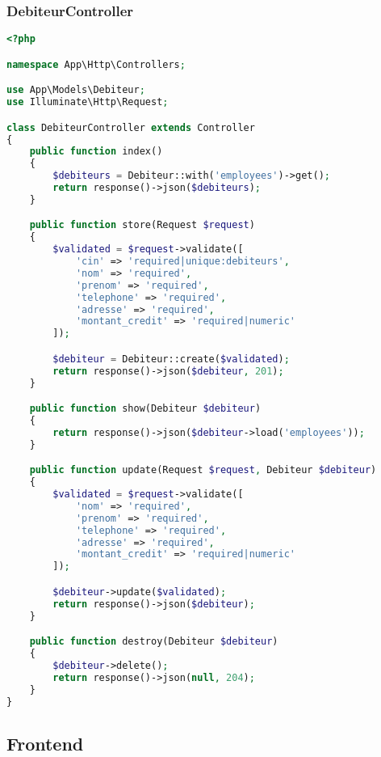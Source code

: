 \documentclass[12pt,a4paper]{report}
\begin{document}
\subsubsection{DebiteurController}
\begin{lstlisting}[language=PHP]
<?php

namespace App\Http\Controllers;

use App\Models\Debiteur;
use Illuminate\Http\Request;

class DebiteurController extends Controller
{
    public function index()
    {
        $debiteurs = Debiteur::with('employees')->get();
        return response()->json($debiteurs);
    }

    public function store(Request $request)
    {
        $validated = $request->validate([
            'cin' => 'required|unique:debiteurs',
            'nom' => 'required',
            'prenom' => 'required',
            'telephone' => 'required',
            'adresse' => 'required',
            'montant_credit' => 'required|numeric'
        ]);

        $debiteur = Debiteur::create($validated);
        return response()->json($debiteur, 201);
    }

    public function show(Debiteur $debiteur)
    {
        return response()->json($debiteur->load('employees'));
    }

    public function update(Request $request, Debiteur $debiteur)
    {
        $validated = $request->validate([
            'nom' => 'required',
            'prenom' => 'required',
            'telephone' => 'required',
            'adresse' => 'required',
            'montant_credit' => 'required|numeric'
        ]);

        $debiteur->update($validated);
        return response()->json($debiteur);
    }

    public function destroy(Debiteur $debiteur)
    {
        $debiteur->delete();
        return response()->json(null, 204);
    }
}
\end{lstlisting}

\subsection{Frontend}
\end{document}
